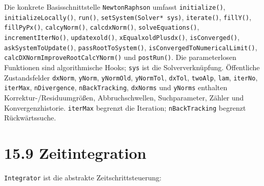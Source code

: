 \documentclass[
  12pt
]{book}
\begin{document}
Die konkrete Basisschnittstelle \texttt{NewtonRaphson} umfasst
\texttt{initialize()}, \texttt{initializeLocally()}, \texttt{run()},
\texttt{setSystem(Solver*\ sys)}, \texttt{iterate()}, \texttt{fillY()},
\texttt{fillPyPx()}, \texttt{calcyNorm()}, \texttt{calcdxNorm()},
\texttt{solveEquations()}, \texttt{incrementIterNo()},
\texttt{updatexold()}, \texttt{xEqualxoldPlusdx()},
\texttt{isConverged()}, \texttt{askSystemToUpdate()},
\texttt{passRootToSystem()}, \texttt{isConvergedToNumericalLimit()},
\texttt{calcDXNormImproveRootCalcYNorm()} und \texttt{postRun()}. Die
parameterlosen Funktionen sind algorithmische Hooks; \texttt{sys} ist
die Solververknüpfung. Öffentliche Zustandsfelder \texttt{dxNorm},
\texttt{yNorm}, \texttt{yNormOld}, \texttt{yNormTol}, \texttt{dxTol},
\texttt{twoAlp}, \texttt{lam}, \texttt{iterNo}, \texttt{iterMax},
\texttt{nDivergence}, \texttt{nBackTracking}, \texttt{dxNorms} und
\texttt{yNorms} enthalten Korrektur-/Residuumgrößen, Abbruchschwellen,
Suchparameter, Zähler und Konvergenzhistorie. \texttt{iterMax} begrenzt
die Iteration; \texttt{nBackTracking} begrenzt Rückwärtssuche.

\hypertarget{abs-api-zeitintegration}{%
\section{\texorpdfstring{{15.9}
Zeitintegration}{15.9 Zeitintegration}}\label{abs-api-zeitintegration}}

\texttt{Integrator} ist die abstrakte Zeitschrittsteuerung:
\end{document}
